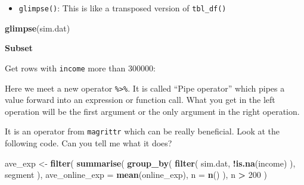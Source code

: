 \documentclass[12pt,]{krantz}
\makeatletter
\newenvironment{Shaded}{\begin{snugshade}}{\end{snugshade}}
\newcommand{\KeywordTok}[1]{\textcolor[rgb]{0.27,0.27,0.27}{\textbf{#1}}}
\newcommand{\DataTypeTok}[1]{\textcolor[rgb]{0.27,0.27,0.27}{#1}}
\newcommand{\DecValTok}[1]{\textcolor[rgb]{0.06,0.06,0.06}{#1}}
\newcommand{\StringTok}[1]{\textcolor[rgb]{0.5,0.5,0.5}{#1}}
\newcommand{\OperatorTok}[1]{\textcolor[rgb]{0.43,0.43,0.43}{\textbf{#1}}}
\newcommand{\NormalTok}[1]{#1}
\providecommand{\tightlist}{%
  \setlength{\itemsep}{0pt}\setlength{\parskip}{0pt}}
\newenvironment{kframe}{%
\medskip{}
\setlength{\fboxsep}{.8em}
 \def\at@end@of@kframe{}%
 \ifinner\ifhmode%
  \def\at@end@of@kframe{\end{minipage}}%
  \begin{minipage}{\columnwidth}%
 \fi\fi%
 \def\FrameCommand##1{\hskip\@totalleftmargin \hskip-\fboxsep
 \colorbox{shadecolor}{##1}\hskip-\fboxsep
     \hskip-\linewidth \hskip-\@totalleftmargin \hskip\columnwidth}%
 \MakeFramed {\advance\hsize-\width
   \@totalleftmargin\z@ \linewidth\hsize
   \@setminipage}}%
 {\par\unskip\endMakeFramed%
 \at@end@of@kframe}
\renewenvironment{Shaded}{\begin{kframe}}{\end{kframe}}
\theoremstyle{definition}
\theoremstyle{definition}
\theoremstyle{definition}
\theoremstyle{remark}
\makeatother
\begin{document}
\begin{itemize}
\tightlist
\item
  \texttt{glimpse()}: This is like a transposed version of
  \texttt{tbl\_df()}
\end{itemize}

\begin{Shaded}
\begin{Highlighting}[]
\KeywordTok{glimpse}\NormalTok{(sim.dat)}
\end{Highlighting}
\end{Shaded}

\textbf{Subset}

Get rows with \texttt{income} more than 300000:

\begin{Shaded}
\end{Shaded}

Here we meet a new operator \texttt{\%\textgreater{}\%}. It is called
``Pipe operator'' which pipes a value forward into an expression or
function call. What you get in the left operation will be the first
argument or the only argument in the right operation.

\begin{Shaded}
\end{Shaded}

It is an operator from \texttt{magrittr} which can be really beneficial.
Look at the following code. Can you tell me what it does?

\begin{Shaded}
\begin{Highlighting}[]
\NormalTok{ave_exp <-}\StringTok{ }\KeywordTok{filter}\NormalTok{( }
  \KeywordTok{summarise}\NormalTok{(}
    \KeywordTok{group_by}\NormalTok{( }
      \KeywordTok{filter}\NormalTok{(}
\NormalTok{        sim.dat, }
        \OperatorTok{!}\KeywordTok{is.na}\NormalTok{(income)}
\NormalTok{      ), }
\NormalTok{      segment}
\NormalTok{    ), }
    \DataTypeTok{ave_online_exp =} \KeywordTok{mean}\NormalTok{(online_exp), }
    \DataTypeTok{n =} \KeywordTok{n}\NormalTok{()}
\NormalTok{  ), }
\NormalTok{  n }\OperatorTok{>}\StringTok{ }\DecValTok{200}
\NormalTok{) }
\end{Highlighting}
\end{Shaded}
\end{document}
